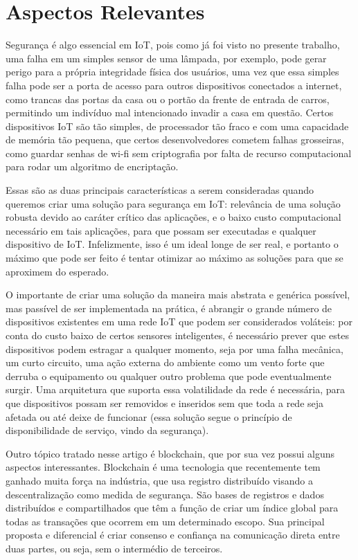 \section{Aspectos Relevantes}

Segurança é algo essencial em IoT, pois como já foi visto no presente trabalho, uma falha em um simples sensor de uma lâmpada, por exemplo, pode gerar perigo para a própria integridade física dos usuários, uma vez que essa simples falha pode ser a porta de acesso para outros dispositivos conectados a internet, como trancas das portas da casa ou o portão da frente de entrada de carros, permitindo um indivíduo mal intencionado invadir a casa em questão. Certos dispositivos IoT são tão simples, de processador tão fraco e com uma capacidade de memória tão pequena, que certos desenvolvedores cometem falhas grosseiras, como guardar senhas de wi-fi sem criptografia por falta de recurso computacional para rodar um algoritmo de encriptação.

Essas são as duas principais características a serem consideradas quando queremos criar uma solução para segurança em IoT: relevância de uma solução robusta devido ao caráter crítico das aplicações, e o baixo custo computacional necessário em tais aplicações, para que possam ser executadas e qualquer dispositivo de IoT. Infelizmente, isso é um ideal longe de ser real, e portanto o máximo que pode ser feito é tentar otimizar ao máximo as soluções para que se aproximem do esperado.

O importante de criar uma solução da maneira mais abstrata e genérica possível, mas passível de ser implementada na prática, é abrangir o grande número de dispositivos existentes em uma rede IoT que podem ser considerados voláteis: por conta do custo baixo de certos sensores inteligentes, é necessário prever que estes dispositivos podem estragar a qualquer momento, seja por uma falha mecânica, um curto circuito, uma ação externa do ambiente como um vento forte que derruba o equipamento ou qualquer outro problema que pode eventualmente surgir. Uma arquitetura que suporta essa volatilidade da rede é necessária, para que dispositivos possam ser removidos e inseridos sem que toda a rede seja afetada ou até deixe de funcionar (essa solução segue o princípio de disponibilidade de serviço, vindo da segurança).

Outro tópico tratado nesse artigo é blockchain, que por sua vez possui alguns aspectos interessantes. Blockchain é uma tecnologia que recentemente tem ganhado muita força na indústria\cite{bcindustry}, que usa registro distribuído visando a descentralização como medida de segurança. São bases de registros e dados distribuídos e compartilhados que têm a função de criar um índice global para todas as transações que ocorrem em um determinado escopo. Sua principal proposta e diferencial é criar consenso e confiança na comunicação direta entre duas partes, ou seja, sem o intermédio de terceiros.

